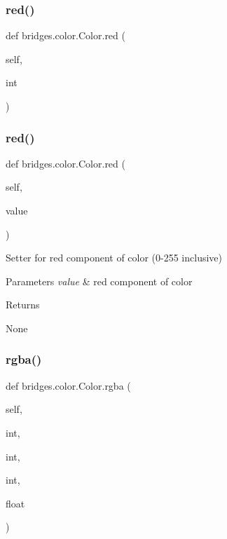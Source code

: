 \subsubsection{\texorpdfstring{red()}{red()}\hspace{0.1cm}{\footnotesize\ttfamily [1/2]}}
{\footnotesize\ttfamily def bridges.\+color.\+Color.\+red (\begin{DoxyParamCaption}\item[{}]{self,  }\item[{}]{int }\end{DoxyParamCaption})}

\mbox{\label{classbridges_1_1color_1_1_color_a39719b281c9095293a1445c6deb7792b}} 
\subsubsection{\texorpdfstring{red()}{red()}\hspace{0.1cm}{\footnotesize\ttfamily [2/2]}}
{\footnotesize\ttfamily def bridges.\+color.\+Color.\+red (\begin{DoxyParamCaption}\item[{}]{self,  }\item[{}]{value }\end{DoxyParamCaption})}



Setter for red component of color (0-\/255 inclusive) 


\begin{DoxyParams}{Parameters}
{\em value} & red component of color \\
\hline
\end{DoxyParams}
\begin{DoxyReturn}{Returns}


None 
\end{DoxyReturn}
\mbox{\label{classbridges_1_1color_1_1_color_a7653dfb80aa5ec25ed14314ffa79d1f2}} 
\subsubsection{\texorpdfstring{rgba()}{rgba()}\hspace{0.1cm}{\footnotesize\ttfamily [1/2]}}
{\footnotesize\ttfamily def bridges.\+color.\+Color.\+rgba (\begin{DoxyParamCaption}\item[{}]{self,  }\item[{}]{int,  }\item[{}]{int,  }\item[{}]{int,  }\item[{}]{float }\end{DoxyParamCaption})}



